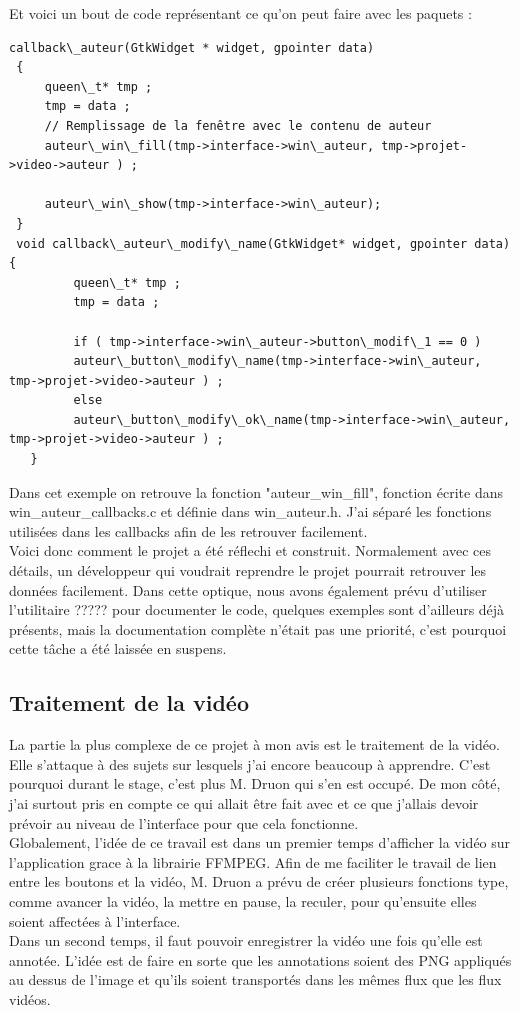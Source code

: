 \documentclass[11pt,french,a4paper]{report}
\begin{document}
Et voici un bout de code représentant ce qu'on peut faire avec les paquets : 
\begin{lstlisting}
callback\_auteur(GtkWidget * widget, gpointer data)
 {
     queen\_t* tmp ;
     tmp = data ;
     // Remplissage de la fenêtre avec le contenu de auteur
     auteur\_win\_fill(tmp->interface->win\_auteur, tmp->projet->video->auteur ) ;

     auteur\_win\_show(tmp->interface->win\_auteur);
 }
 void callback\_auteur\_modify\_name(GtkWidget* widget, gpointer data) {
         queen\_t* tmp ;
         tmp = data ;

         if ( tmp->interface->win\_auteur->button\_modif\_1 == 0 )
         auteur\_button\_modify\_name(tmp->interface->win\_auteur, tmp->projet->video->auteur ) ;
         else
         auteur\_button\_modify\_ok\_name(tmp->interface->win\_auteur, tmp->projet->video->auteur ) ;
   }
\end{lstlisting}
Dans cet exemple on retrouve la fonction "auteur\_win\_fill", fonction écrite dans win\_auteur\_callbacks.c et définie
dans win\_auteur.h. J'ai séparé les fonctions utilisées dans les callbacks afin de les retrouver facilement. \\
Voici donc comment le projet a été réflechi et construit. Normalement avec ces détails, un développeur qui voudrait reprendre
le projet pourrait retrouver les données facilement. Dans cette optique, nous avons également prévu d'utiliser %
l'utilitaire ????? pour documenter le code, quelques exemples sont d'ailleurs déjà présents, mais la documentation 
complète n'était pas une priorité, c'est pourquoi cette tâche a été laissée en suspens. 
       
        \subsection{Traitement de la vidéo}
La partie la plus complexe de ce projet à mon avis est le traitement de la vidéo. Elle s'attaque à des sujets sur lesquels j'ai 
encore beaucoup à apprendre. C'est pourquoi durant le stage, c'est plus M. Druon qui s'en est occupé. De mon côté, j'ai surtout
pris en compte ce qui allait être fait avec et ce que j'allais devoir prévoir au niveau de l'interface pour que cela fonctionne. \\
Globalement, l'idée de ce travail est dans un premier temps d'afficher la vidéo sur l'application grace à 
la librairie FFMPEG. Afin de me faciliter
le travail de lien entre les boutons et la vidéo, M. Druon a prévu de créer plusieurs fonctions type, comme avancer la vidéo, la 
mettre en pause, la reculer, pour qu'ensuite elles soient affectées à l'interface. \\
Dans un second temps, il faut pouvoir enregistrer la vidéo une fois qu'elle est annotée. L'idée est de faire en sorte que les annotations
soient des PNG appliqués au dessus de l'image et qu'ils soient transportés dans les mêmes flux que les flux vidéos. \\
\end{document}

